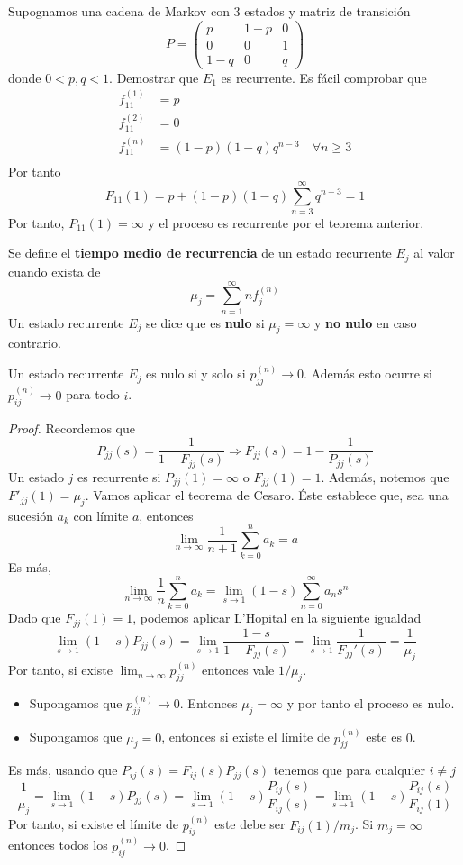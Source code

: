 \documentclass[PREyA.tex]{subfiles}
\begin{document}
\begin{example}
Supognamos una cadena de Markov con $3$ estados y matriz de transición
$$
P=
\begin{pmatrix}
p & 1-p &0 \\
0 & 0 & 1\\
1-q & 0 & q
\end{pmatrix}
$$
donde $0<p,q<1$. Demostrar que $E_1$ es recurrente. Es fácil comprobar que
\begin{align*}
f_{11}^{(1)} &= p\\
f_{11}^{(2)} &=0\\
 f_{11}^{(n)}&=(1-p)(1-q)q^{n-3} \quad \forall n\geq 3\\
\end{align*}
Por tanto
$$
F_{11}(1) = p + (1-p)(1-q)\sum_{n=3}^\infty q^{n-3} = 1
$$
Por tanto, $P_{11}(1)=\infty$ y el proceso es recurrente por el teorema anterior.
\end{example}
\begin{defi}
Se define el \textbf{tiempo medio de recurrencia} de un estado recurrente $E_j$ al valor cuando exista de
$$
\mu_j=  \sum_{n=1}^\infty nf_j^{(n)}
$$
Un estado recurrente $E_j$ se dice que es \textbf{nulo} si $\mu_j=\infty$ y \textbf{no nulo} en caso contrario.
\end{defi}
\begin{theorem}
Un estado recurrente $E_j$ es nulo si y solo si $p_{jj}^{(n)} \to 0$. Además esto ocurre si $p_{ij}^{(n)} \to 0$ para todo $i$.
\end{theorem}
\begin{proof}
Recordemos que
$$
P_{jj}(s)=\frac{1}{1-F_{jj}(s)} \Rightarrow F_{jj}(s)=1-\frac{1}{P_{jj}(s)} 
$$
Un estado $j$ es recurrente si $P_{jj}(1) = \infty$ o $F_{jj}(1)=1$. Además, notemos que $F'_{jj}(1)=\mu_j$. Vamos aplicar el teorema de Cesaro. Éste establece que, sea una sucesión $a_k$ con límite $a$, entonces
$$
\lim_{n\to \infty} \frac{1}{n+1}\sum_{k=0}^n a_k = a
$$
Es más,
$$
\lim_{n\to \infty} \frac{1}{n}\sum_{k=0}^n a_k = \lim_{s\to 1}(1-s)\sum_{n=0}^\infty a_n s^n
$$
Dado que $F_{jj}(1)=1$, podemos aplicar L'Hopital en la siguiente igualdad
$$
\lim_{s\to 1} (1-s)P_{jj}(s)=\lim_{s \to 1} \frac{1-s}{1-F_{jj}(s)} =  \lim_{s \to 1} \frac{1}{F_{jj}'(s)}  = \frac{1}{\mu_j}
$$
Por tanto, si existe $\lim_{n\to \infty} p_{jj}^{(n)}$ entonces vale $1/\mu_j$. 
\begin{itemize}
\item Supongamos que $p_{jj}^{(n)}\to0$. Entonces $\mu_j = \infty$ y por tanto el proceso es nulo.
\item Supongamos que $\mu_j = 0$, entonces si existe el límite de $p_{jj}^{(n)}$ este es $0$.
\end{itemize}
Es más, usando que $P_{ij}(s)=F_{ij}(s)P_{jj}(s)$ tenemos que para cualquier $i\neq j$
$$
\frac{1}{\mu_j} = \lim_{s\to 1} (1-s)P_{jj}(s)= \lim_{s\to 1} (1-s)\frac{P_{ij}(s)}{F_{ij}(s)} = \lim_{s\to 1} (1-s)\frac{P_{ij}(s)}{F_{ij}(1)} 
$$
Por tanto, si existe el límite de $p_{ij}^{(n)}$ este debe ser $F_{ij}(1)/m_j$. Si $m_j = \infty$ entonces todos los $p_{ij}^{(n)} \to 0$.
\end{proof}
\end{document}
